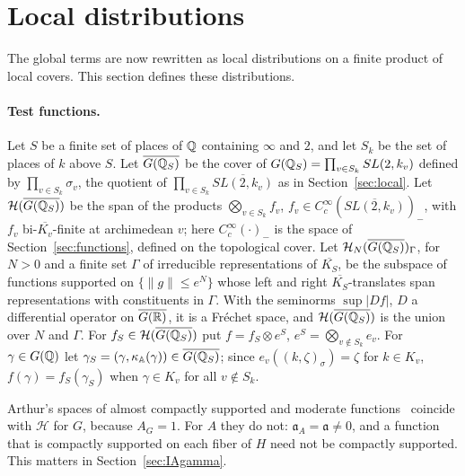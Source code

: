 \section{Local distributions}\label{sec:local-dist}

The global terms are now rewritten as local distributions on a finite
product of local covers. This section defines these distributions.


\paragraph{Test functions.} Let $S$ be a finite set of places of $\mathbb{Q}$
containing $\infty$ and $2$, and let $S_k$ be the set of places of $k$
above $S$. Let $\overline{G(\mathbb{Q}_S)}$ be the cover of $G(\mathbb{Q}_S)=
\prod_{v\in S_k}SL(2,k_v)$ defined by $\prod_{v\in S_k}\sigma_v$, the
quotient of $\prod_{v\in S_k}\overline{SL(2,k_v)}$ as in
Section~\ref{sec:local}. Let $\mathcal H(\overline{G(\mathbb{Q}_S)})$ be the span
of the products $\bigotimes_{v\in S_k}f_v$, $f_v\in
C_c^\infty(\overline{SL(2,k_v)})_-$, with $f_v$ bi-$\overline{K_v}$-finite
at archimedean $v$; here $C_c^\infty(\cdot)_-$ is the space of
Section~\ref{sec:functions}, defined on the topological cover. Let
$\mathcal H_N(\overline{G(\mathbb{Q}_S)})_\Gamma$, for $N>0$ and a finite set $\Gamma$ of irreducible
representations of $\overline{K_S}$, be the subspace of functions
supported on $\{\|g\|\le e^N\}$ whose left and right
$\overline{K_S}$-translates span representations with constituents in
$\Gamma$. With the seminorms $\sup|Df|$, $D$ a differential operator on
$\overline{G(\mathbb{R})}$, it is a Fr\'echet space, and
$\mathcal H(\overline{G(\mathbb{Q}_S)})$ is the union over $N$ and $\Gamma$. For
$f_S\in\mathcal H(\overline{G(\mathbb{Q}_S)})$ put $f=f_S\otimes e^S$, $e^S=
\bigotimes_{v\notin S_k}e_v$. For $\gamma\in G(\mathbb{Q})$ let
$\gamma_S=(\gamma,\kappa_{\mathbb{A}}(\gamma))\in\overline{G(\mathbb{Q}_S)}$; since
$e_v((k,\zeta)_\sigma)=\zeta$ for $k\in K_v$, $f(\gamma)=f_S(\gamma_S)$
when $\gamma\in K_v$ for all $v\notin S_k$.

Arthur's spaces of almost compactly supported and moderate
functions~\cite{Ar88b} coincide with $\mathcal H$ for $G$, because $A_G=1$.
For $A$ they do not: $\mathfrak a_A=\mathfrak a\ne0$, and a function that
is compactly supported on each fiber of $H$ need not be compactly
supported. This matters in Section~\ref{sec:IAgamma}.

